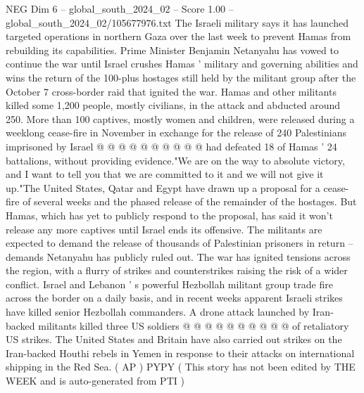 \begin{textsample}{NEG Dim 6 – global\_south\_2024\_02 – Score 1.00 – global\_south\_2024\_02/105677976.txt}
The Israeli military says it has launched targeted operations in northern Gaza over the last week to prevent Hamas from rebuilding its capabilities.
Prime Minister Benjamin Netanyahu has vowed to continue the war until Israel crushes Hamas ' military and governing abilities and wins the return of the 100-plus hostages still held by the militant group after the October 7 cross-border raid that ignited the war.
Hamas and other militants killed some 1,200 people, mostly civilians, in the attack and abducted around 250.
More than 100 captives, mostly women and children, were released during a weeklong cease-fire in November in exchange for the release of 240 Palestinians imprisoned by Israel @ @ @ @ @ @ @ @ @ @ had defeated 18 of Hamas ' 24 battalions, without providing evidence."We are on the way to absolute victory, and I want to tell you that we are committed to it and we will not give it up."The United States, Qatar and Egypt have drawn up a proposal for a cease-fire of several weeks and the phased release of the remainder of the hostages.
But Hamas, which has yet to publicly respond to the proposal, has said it won't release any more captives until Israel ends its offensive.
The militants are expected to demand the release of thousands of Palestinian prisoners in return -- demands Netanyahu has publicly ruled out.
The war has ignited tensions across the region, with a flurry of strikes and counterstrikes raising the risk of a wider conflict.
Israel and Lebanon ' s powerful Hezbollah militant group trade fire across the border on a daily basis, and in recent weeks apparent Israeli strikes have killed senior Hezbollah commanders.
A drone attack launched by Iran-backed militants killed three US soldiers @ @ @ @ @ @ @ @ @ @ of retaliatory US strikes.
The United States and Britain have also carried out strikes on the Iran-backed Houthi rebels in Yemen in response to their attacks on international shipping in the Red Sea. ( AP ) PYPY ( This story has not been edited by THE WEEK and is auto-generated from PTI )

\end{textsample}
